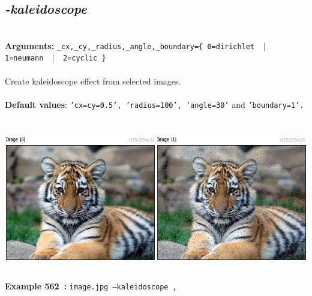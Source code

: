 \documentclass[a4paper,11pt,twoside]{book}
\begin{document}
\subsection{\emph{-kaleidoscope} }\vspace*{-0.5em}
~\\\textbf{Arguments: } 
{\small \texttt{\_cx,\_cy,\_radius,\_angle,\_boundary=\{ 0=dirichlet ~$|$~ 1=neumann ~$|$~ 2=cyclic \}}}\\~\\
Create kaleidoscope effect from selected images.
~\\~\\\textbf{Default values}: {\small \texttt{'cx=cy=0.5', 'radius=100', 'angle=30'} and \texttt{'boundary=1'.}}
\begin{center}\includegraphics[keepaspectratio=true,height=7cm,width=\textwidth]{img/gmic_def562.jpg}\\
{\footnotesize \textbf{Example 562~:} \texttt{image.jpg --kaleidoscope ,}}
\end{center}
\end{document}
